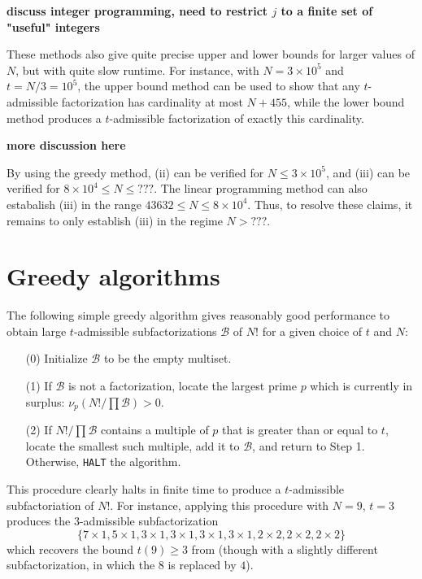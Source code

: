 \documentclass[12pt,a4paper,reqno]{amsart}
\numberwithin{equation}{section}
\theoremstyle{plain}
\theoremstyle{definition}
\newcommand\tuple{{\mathcal B}}
\begin{document}
{\bf discuss integer programming, need to restrict $j$ to a finite set of "useful" integers}

These methods also give quite precise upper and lower bounds for larger values of $N$, but with quite slow runtime. For instance, with $N = 3 \times 10^5$ and $t = N/3 = 10^5$, the upper bound method can be used to show that any $t$-admissible factorization has cardinality at most $N+455$, while the lower bound method produces a $t$-admissible factorization of exactly this cardinality.

{\bf more discussion here}

By using the greedy method, (ii) can be verified for $N \leq 3 \times 10^5$, and (iii) can be verified for $8 \times 10^4 \leq N \leq ???$.  The linear programming method can also estabalish (iii) in the range $43632 \leq N \leq 8 \times 10^4$.  Thus, to resolve these claims, it remains to only establish (iii) in the regime $N > ???$.

\section{Greedy algorithms}\label{greedy-sec}

The following simple greedy algorithm gives reasonably good performance to obtain large $t$-admissible subfactorizations $\tuple$ of $N!$ for a given choice of $t$ and $N$:

\begin{enumerate}
\item[(0)] Initialize $\tuple$ to be the empty multiset. 
\item[(1)] If $\tuple$ is not a factorization, locate the largest prime $p$ which is currently in surplus: $\nu_p(N!/\prod \tuple) > 0$. 
\item[(2)] If $N! / \prod \tuple$ contains a multiple of $p$ that is greater than or equal to $t$, locate the smallest such multiple, add it to $\tuple$, and return to Step 1.  Otherwise, \texttt{HALT} the algorithm. 
\end{enumerate}

This procedure clearly halts in finite time to produce a $t$-admissible subfactoriation of $N!$.  For instance, applying this procedure with $N=9$, $t=3$ produces the $3$-admissible subfactorization
$$ \{7 \times 1, 5 \times 1, 3 \times 1, 3 \times 1, 3 \times 1, 3 \times 1, 2 \times 2, 2 \times 2, 2 \times 2 \}$$
which recovers the bound $t(9) \geq 3$ from  (though with a slightly different subfactorization, in which the $8$ is replaced by $4$).
\end{document}
